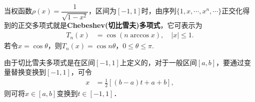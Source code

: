 \documentclass[../../main.tex]{subfiles}
\begin{document}
\begin{definition}
当权函数$\rho(x) = \dfrac{1}{\sqrt{1 - x^2}}$，区间为$[-1,1]$时，由序列$\{1,x,\cdots,x^n,\cdots\}$正交化得到的正交多项式就是\textbf{Chebeshev(切比雪夫)多项式}，它可表示为
\begin{align}\label{eq:数值分析-3-2.10}
T_n(x) &= \cos(n \arccos x),\quad |x| \leq 1.
\end{align}
若令$x = \cos\theta$，则$T_n(x) = \cos n\theta$，$0 \leq \theta \leq \pi$.
\end{definition}
\begin{remark}
由于切比雪夫多项式是在区间$[-1,1]$上定义的，对于一般区间$[a,b]$，要通过变量替换变换到$[-1,1]$，可令
\begin{align}\label{eq:数值分析-3-2.14}
x &= \frac{1}{2}[(b - a)t + a + b],
\end{align}
则可将$x \in [a,b]$变换到$t \in [-1,1]$．
\end{remark}
\end{document}
